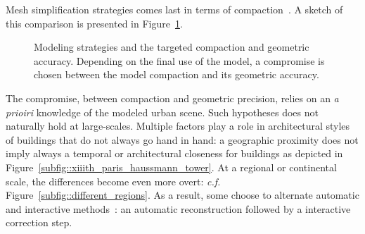            Mesh simplification strategies comes last in terms of compaction~\parencite{verdie2015lod, zhou20102}.
            A sketch of this comparison is presented in Figure~\ref{fig::modeling_strategies}.\\
            \begin{figure}[htpb]
                \centering
                            
                \caption[
                    Modeling strategies and the targeted compaction and geometric accuracy.
                ]{
                    \label{fig::modeling_strategies}
                    Modeling strategies and the targeted compaction and geometric accuracy.
                    Depending on the final use of the model, a compromise is chosen between the model compaction and its geometric accuracy.
                }
            \end{figure}
            The compromise, between compaction and geometric precision, relies on an \textit{a prioiri} knowledge of the modeled urban scene.
            Such hypotheses does not naturally hold at large-scales.
            Multiple factors play a role in architectural styles of buildings that do not always go hand in hand:
            a geographic proximity does not imply always a temporal or architectural closeness for buildings as depicted in Figure~\ref{subfig::xiiith_paris_haussmann_tower}.
            At a regional or continental scale, the differences become even more overt: \textit{c.f.} Figure~\ref{subfig::different_regions}.
            As a result, some choose to alternate automatic and interactive methods~\parencite{musialski2013survey}: an automatic reconstruction followed by a interactive correction step.
